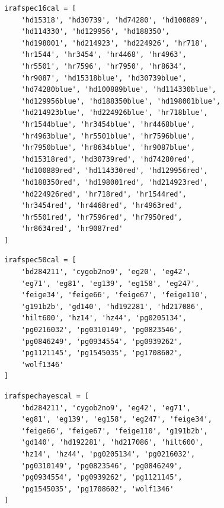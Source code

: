 \documentclass[fleqn,usenatbib]{mnras}
\begin{document}
\begin{verbatim}
irafspec16cal = [
    'hd15318', 'hd30739', 'hd74280', 'hd100889',
    'hd114330', 'hd129956', 'hd188350',
    'hd198001', 'hd214923', 'hd224926', 'hr718',
    'hr1544', 'hr3454', 'hr4468', 'hr4963',
    'hr5501', 'hr7596', 'hr7950', 'hr8634',
    'hr9087', 'hd15318blue', 'hd30739blue',
    'hd74280blue', 'hd100889blue', 'hd114330blue',
    'hd129956blue', 'hd188350blue', 'hd198001blue',
    'hd214923blue', 'hd224926blue', 'hr718blue',
    'hr1544blue', 'hr3454blue', 'hr4468blue',
    'hr4963blue', 'hr5501blue', 'hr7596blue',
    'hr7950blue', 'hr8634blue', 'hr9087blue',
    'hd15318red', 'hd30739red', 'hd74280red',
    'hd100889red', 'hd114330red', 'hd129956red',
    'hd188350red', 'hd198001red', 'hd214923red',
    'hd224926red', 'hr718red', 'hr1544red',
    'hr3454red', 'hr4468red', 'hr4963red',
    'hr5501red', 'hr7596red', 'hr7950red',
    'hr8634red', 'hr9087red'
]
\end{verbatim}

\begin{verbatim}
irafspec50cal = [
    'bd284211', 'cygob2no9', 'eg20', 'eg42',
    'eg71', 'eg81', 'eg139', 'eg158', 'eg247',
    'feige34', 'feige66', 'feige67', 'feige110',
    'g191b2b', 'gd140', 'hd192281', 'hd217086',
    'hilt600', 'hz14', 'hz44', 'pg0205134',
    'pg0216032', 'pg0310149', 'pg0823546',
    'pg0846249', 'pg0934554', 'pg0939262',
    'pg1121145', 'pg1545035', 'pg1708602',
    'wolf1346'
]
\end{verbatim}

\begin{verbatim}
irafspechayescal = [
    'bd284211', 'cygob2no9', 'eg42', 'eg71',
    'eg81', 'eg139', 'eg158', 'eg247', 'feige34',
    'feige66', 'feige67', 'feige110', 'g191b2b',
    'gd140', 'hd192281', 'hd217086', 'hilt600',
    'hz14', 'hz44', 'pg0205134', 'pg0216032',
    'pg0310149', 'pg0823546', 'pg0846249',
    'pg0934554', 'pg0939262', 'pg1121145',
    'pg1545035', 'pg1708602', 'wolf1346'
]
\end{verbatim}



\bsp	%
\label{lastpage}
\end{document}
